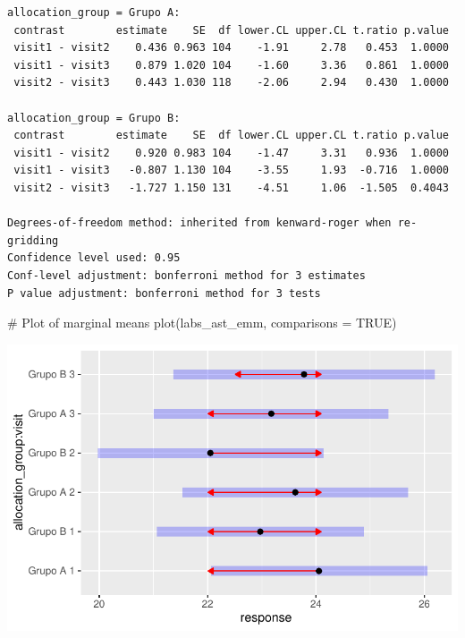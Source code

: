\documentclass[
  letterpaper,
  DIV=11,
  numbers=noendperiod]{scrartcl}
\newenvironment{Shaded}{\begin{snugshade}}{\end{snugshade}}
\newcommand{\AttributeTok}[1]{\textcolor[rgb]{0.40,0.45,0.13}{#1}}
\newcommand{\CommentTok}[1]{\textcolor[rgb]{0.37,0.37,0.37}{#1}}
\newcommand{\ConstantTok}[1]{\textcolor[rgb]{0.56,0.35,0.01}{#1}}
\newcommand{\FunctionTok}[1]{\textcolor[rgb]{0.28,0.35,0.67}{#1}}
\newcommand{\NormalTok}[1]{\textcolor[rgb]{0.00,0.23,0.31}{#1}}
\begin{document}
\begin{verbatim}
allocation_group = Grupo A:
 contrast        estimate    SE  df lower.CL upper.CL t.ratio p.value
 visit1 - visit2    0.436 0.963 104    -1.91     2.78   0.453  1.0000
 visit1 - visit3    0.879 1.020 104    -1.60     3.36   0.861  1.0000
 visit2 - visit3    0.443 1.030 118    -2.06     2.94   0.430  1.0000

allocation_group = Grupo B:
 contrast        estimate    SE  df lower.CL upper.CL t.ratio p.value
 visit1 - visit2    0.920 0.983 104    -1.47     3.31   0.936  1.0000
 visit1 - visit3   -0.807 1.130 104    -3.55     1.93  -0.716  1.0000
 visit2 - visit3   -1.727 1.150 131    -4.51     1.06  -1.505  0.4043

Degrees-of-freedom method: inherited from kenward-roger when re-gridding 
Confidence level used: 0.95 
Conf-level adjustment: bonferroni method for 3 estimates 
P value adjustment: bonferroni method for 3 tests 
\end{verbatim}

\begin{Shaded}
\begin{Highlighting}[]
\CommentTok{\# Plot of marginal means}
\FunctionTok{plot}\NormalTok{(labs\_ast\_emm, }\AttributeTok{comparisons =} \ConstantTok{TRUE}\NormalTok{)}
\end{Highlighting}
\end{Shaded}

\includegraphics{Outcomes_V1V2V3_files/figure-pdf/labs_ast_sens_emm-1.pdf}
\end{document}
